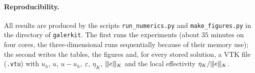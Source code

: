 \paragraph{Reproducibility.} All results are produced by the scripts \texttt{run\_numerics.py} and
\texttt{make\_figures.py} in the directory
 of \texttt{galerkit}. The first runs the experiments (about
$35$ minutes on four cores, the three-dimensional runs sequentially because of their memory use); the
second writes the tables, the figures and, for every stored solution, a VTK file
(\texttt{.vtu}) with $u_h$, $u$, $u-u_h$, $\varepsilon$, $\eta_K$, $\lvert\kern-0.25ex\lvert\kern-0.25ex\lvert e\rvert\kern-0.25ex\rvert\kern-0.25ex\rvert_K$ and the local effectivity
$\eta_K/\lvert\kern-0.25ex\lvert\kern-0.25ex\lvert e\rvert\kern-0.25ex\rvert\kern-0.25ex\rvert_K$. 

